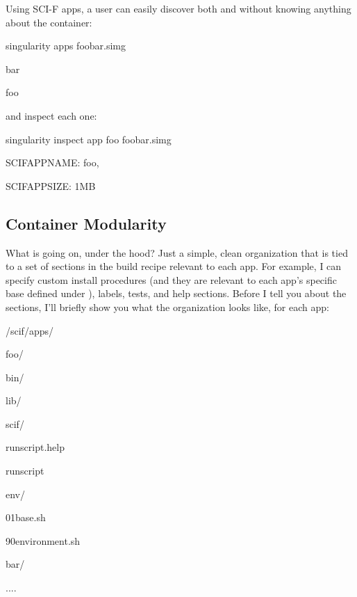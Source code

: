 \documentclass[letterpaper,10pt,english]{sphinxmanual}
\begin{document}
Using SCI-F apps, a user can easily discover both  and  without knowing
anything about the container:

%
\begin{sphinxVerbatim}[commandchars=\\\{\}]
singularity apps foobar.simg

bar

foo
\end{sphinxVerbatim}

\begin{DUlineblock}{0em}
\item[] and inspect each one:
\end{DUlineblock}

%
\begin{sphinxVerbatim}[commandchars=\\\{\}]
singularity inspect \PYGZhy{}\PYGZhy{}app foo  foobar.simg

\PYGZob{}

    \PYGZdq{}SCIF\PYGZus{}APP\PYGZus{}NAME\PYGZdq{}: \PYGZdq{}foo\PYGZdq{},

    \PYGZdq{}SCIF\PYGZus{}APP\PYGZus{}SIZE\PYGZdq{}: \PYGZdq{}1MB\PYGZdq{}

\PYGZcb{}
\end{sphinxVerbatim}


\subsection{Container Modularity}
\label{\detokenize{reproducible_scif_apps:container-modularity}}
What is going on, under the hood? Just a simple, clean organization that
is tied to a set of sections in the build recipe relevant to each app.
For example, I can specify custom install procedures (and they are
relevant to each app’s specific base defined under ), labels, tests, and
help sections. Before I tell you about the sections, I’ll briefly show
you what the organization looks like, for each app:

%
\begin{sphinxVerbatim}[commandchars=\\\{\}]
/scif/apps/


     foo/

        bin/

        lib/

        scif/

            runscript.help

            runscript

            env/

                01\PYGZhy{}base.sh

                90\PYGZhy{}environment.sh


     bar/

     ....
\end{sphinxVerbatim}
\end{document}
